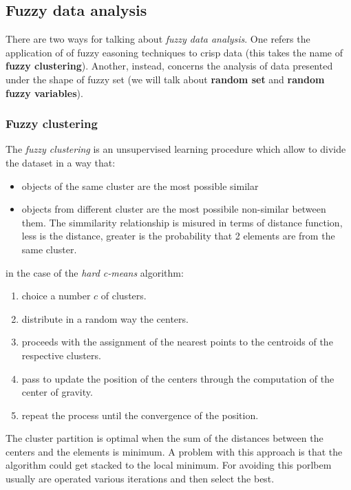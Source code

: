 \documentclass{article}
\begin{document}
\subsection{Fuzzy data analysis}
There are two ways for talking about \textit{fuzzy data analysis}. One refers the application of
of fuzzy easoning techniques to crisp data (this takes the name of \textbf{fuzzy clustering}). Another,
instead, concerns the analysis of data presented under the shape of fuzzy set (we will talk
about \textbf{random set} and \textbf{random fuzzy variables}).

\subsubsection{Fuzzy clustering}
The \textit{fuzzy clustering} is an unsupervised learning procedure which allow to
divide the dataset in a way that:
\begin{itemize}
    \item objects of the same cluster are the most possible similar
    \item objects from different cluster are the most possibile non-similar between them.
          The simmilarity relationship is misured in terms of distance function, less is the
          distance, greater is the probability that 2 elements are from the same cluster.
\end{itemize}
in the case of the \textit{hard c-means} algorithm:
\begin{enumerate}
    \item choice a number $c$ of clusters.
    \item distribute in a random way the centers.
    \item proceeds with the assignment of the nearest points to the centroids
          of the respective clusters.
    \item pass to update the position of the centers through the computation
          of the center of gravity.
    \item repeat the process until the convergence of the position.
\end{enumerate}
The cluster partition is optimal when the sum of the distances between the centers and
the elements is minimum. A problem with this approach is that the algorithm could
get stacked to the local minimum. For avoiding this porlbem usually are operated
various iterations and then select the best.
\end{document}
